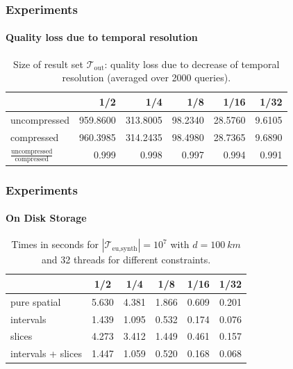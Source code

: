 \documentclass{beamer}
\newcommand{\traj}[2]{\mathcal{T}_{\text{#1},\text{#2}}}
\begin{document}
\begin{frame}
	\frametitle{Experiments}
	\framesubtitle{Quality loss due to temporal resolution}
	\begin{table}
		{
		\caption{Size of result set $\mathcal{T}_{\text{out}}$: quality loss due to decrease of temporal resolution (averaged over 2000 queries).}\label{tab:temporalQualityLoss}
		\begin{tabular}{|l||r|r|r|r|r|}
			\hline
			                                                & 1/2      & 1/4      & 1/8     & 1/16    & 1/32   \\
			\hline
			uncompressed                                    & 959.8600 & 313.8005 & 98.2340 & 28.5760 & 9.6105 \\
			compressed                                      & 960.3985 & 314.2435 & 98.4980 & 28.7365 & 9.6890 \\
			$\frac{\text{uncompressed}}{\text{compressed}}$ & 0.999    & 0.998    & 0.997   & 0.994   & 0.991  \\
			\hline
		\end{tabular}
		}
	\end{table}
\end{frame}

\begin{frame}
	\frametitle{Experiments}
	\framesubtitle{On Disk Storage}
	\begin{table}
		{
			\caption[Messungen$europe\_10\_24_time_variants_nekton$]{Times in seconds for $|\traj{eu}{synth}|=10^7$ with $d=\SI{100}{km}$ and 32 threads for different constraints.}
			\begin{tabular}{|l||c|c|c|c|c|}
				\hline
				                   & 1/2   & 1/4   & 1/8   & 1/16  & 1/32
				\\ \hline
				pure spatial       & 5.630 & 4.381 & 1.866 & 0.609 & 0.201 \\
				intervals          & 1.439 & 1.095 & 0.532 & 0.174 & 0.076 \\
				slices             & 4.273 & 3.412 & 1.449 & 0.461 & 0.157 \\
				intervals + slices & 1.447 & 1.059 & 0.520 & 0.168 & 0.068 \\
				\hline
			\end{tabular}
		}
	\end{table}
\end{frame}
\end{document}
